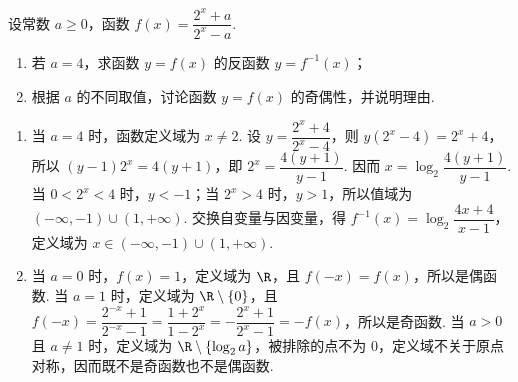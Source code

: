 \begin{problem}
设常数 \(a \geqslant 0\)，函数 \(f(x) = \dfrac{2^x + a}{2^x - a}\).
\begin{enumerate}
\item 若 \(a = 4\)，求函数 \(y = f(x)\) 的反函数 \(y = f^{-1}(x)\)；
\item 根据 \(a\) 的不同取值，讨论函数 \(y = f(x)\) 的奇偶性，并说明理由.
\end{enumerate}

\begin{solution}
\begin{enumerate}
\item 当 \(a=4\) 时，函数定义域为 \(x\ne2\). 设 \(y=\dfrac{2^x+4}{2^x-4}\)，则 \(y(2^x-4)=2^x+4\)，所以 \((y-1)2^x=4(y+1)\)，即 \(2^x=\dfrac{4(y+1)}{y-1}\). 因而
\(x=\log_2\dfrac{4(y+1)}{y-1}\). 当 \(0<2^x<4\) 时，\(y<-1\)；当 \(2^x>4\) 时，\(y>1\)，所以值域为 \((-\infty,-1)\cup(1,+\infty)\). 交换自变量与因变量，得
\(f^{-1}(x)=\log_2\dfrac{4x+4}{x-1}\)，定义域为 \(x\in(-\infty,-1)\cup(1,+\infty)\).
\item 当 \(a=0\) 时，\(f(x)=1\)，定义域为 \(\R\)，且 \(f(-x)=f(x)\)，所以是偶函数. 当 \(a=1\) 时，定义域为 \(\R\mathbin{\backslash}\{0\}\)，且
\(f(-x)=\dfrac{2^{-x}+1}{2^{-x}-1}=\dfrac{1+2^x}{1-2^x}=-\dfrac{2^x+1}{2^x-1}=-f(x)\)，所以是奇函数. 当 \(a>0\) 且 \(a\ne1\) 时，定义域为 \(\R\mathbin{\backslash}\{\log_2a\}\)，被排除的点不为 \(0\)，定义域不关于原点对称，因而既不是奇函数也不是偶函数.
\end{enumerate}
\end{solution}
\end{problem}

